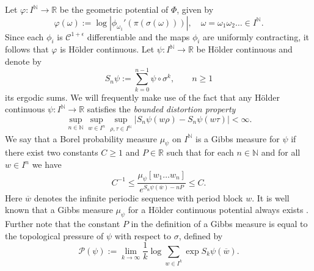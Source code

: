 \documentclass[11pt]{amsart}
\newcommand\RR{\mathbb{R}}
\newcommand{\1}{1}
\newcommand{\N}{\mathbb{N}}
\newcommand{\R}{\mathbb{R}}
\begin{document}
Let $\varphi:I^{\N}\rightarrow\R$ be the geometric
potential of $\Phi$, given by
\begin{equation} \label{eq:geometric-potential}
\varphi(\omega):=\log\left|\phi_{\omega_{1}}'(\pi(\sigma(\omega)))\right|,\quad\omega=\omega_{1}\omega_{2}\dots\in I^{\N}.
\end{equation}
Since each $\phi_i$ is $\mathcal{C}^{1+\epsilon}$ differentiable and the maps $\phi_i$ are uniformly contracting, it follows that $\varphi$ is H\"older continuous. Let $\psi:I^{\N}\rightarrow\R$ be H\"older continuous and denote by 
\[
S_{n}\psi:=\sum_{k=0}^{n-1}\psi\circ\sigma^{k}, \qquad n\geq 1
\]
its ergodic sums. We will frequently make use of the fact that any H\"older continuous $\psi:I^\N\rightarrow \R$ satisfies the {\em bounded distortion property}
\begin{equation}\label{eq:bdd}
\sup_{n\in \N} \sup_{w\in I^n} \sup_{\rho,\tau\in I^\N }\left|S_n \psi(w\rho)-S_n\psi(w\tau)\right|<\infty.
\end{equation} We say that a Borel probability measure $\mu_\psi$ on $I^{\N}$  is a Gibbs measure for $\psi$  if there exist two constants $C\ge 1$ and $P\in \R$ such that for each $n\in \N$ and for all $w \in I^n$ we have 
\begin{equation}\label{eq:gibbs}
C^{-1}\le \frac{\mu_\psi[w_1\dots w_n]}{e^{S_n\psi(\overline w)-nP }}\le C.
\end{equation} Here $\overline{w}$ denotes the infinite periodic sequence with period block $w$. 
It is well known that a Gibbs measure $\mu_\psi$ for a H\"older continuous potential always exists  \cite{bowen-equilibrium}.
Further note that the constant $P$ in the definition of a Gibbs measure is equal to  the topological pressure of $\psi$ with respect to $\sigma$, defined by
\[
\mathcal{P}(\psi):=\lim_{k\to\infty}\frac{1}{k}\log\sum_{w\in I^k}\exp S_k \psi(\overline{w}).
\]
\end{document}

